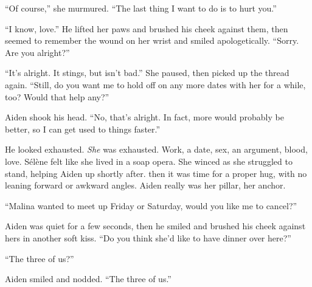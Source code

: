 ``Of course,'' she murmured. ``The last thing I want to do is to hurt you.''

``I know, love.'' He lifted her paws and brushed his cheek against them, then seemed to remember the wound on her wrist and smiled apologetically. ``Sorry. Are you alright?''

``It's alright. It stings, but isn't bad.'' She paused, then picked up the thread again. ``Still, do you want me to hold off on any more dates with her for a while, too? Would that help any?''

Aiden shook his head. ``No, that's alright. In fact, more would probably be better, so I can get used to things faster.''

He looked exhausted. \emph{She} was exhausted. Work, a date, sex, an argument, blood, love. Sélène felt like she lived in a soap opera. She winced as she struggled to stand, helping Aiden up shortly after. then it was time for a proper hug, with no leaning forward or awkward angles. Aiden really was her pillar, her anchor.

``Malina wanted to meet up Friday or Saturday, would you like me to cancel?''

Aiden was quiet for a few seconds, then he smiled and brushed his cheek against hers in another soft kiss. ``Do you think she'd like to have dinner over here?''

``The three of us?''

Aiden smiled and nodded. ``The three of us.''
